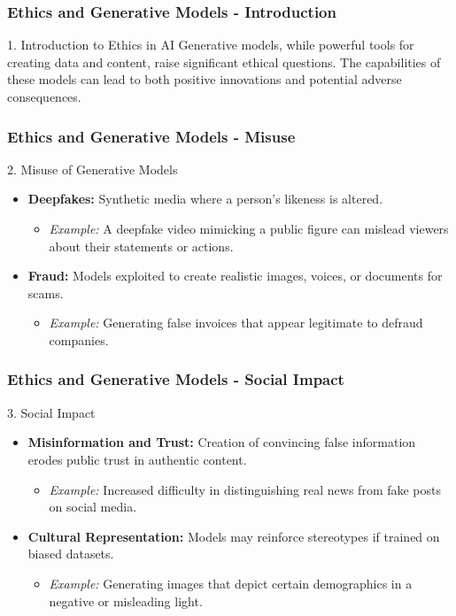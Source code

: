 \documentclass[aspectratio=169]{beamer}
\begin{document}
\begin{frame}[fragile]
    \frametitle{Ethics and Generative Models - Introduction}
    \begin{block}{1. Introduction to Ethics in AI}
        Generative models, while powerful tools for creating data and content, raise significant ethical questions. The capabilities of these models can lead to both positive innovations and potential adverse consequences.
    \end{block}
\end{frame}

\begin{frame}[fragile]
    \frametitle{Ethics and Generative Models - Misuse}
    \begin{block}{2. Misuse of Generative Models}
        \begin{itemize}
            \item \textbf{Deepfakes:} Synthetic media where a person's likeness is altered.
            \begin{itemize}
                \item \textit{Example:} A deepfake video mimicking a public figure can mislead viewers about their statements or actions.
            \end{itemize}
            \item \textbf{Fraud:} Models exploited to create realistic images, voices, or documents for scams.
            \begin{itemize}
                \item \textit{Example:} Generating false invoices that appear legitimate to defraud companies.
            \end{itemize}
        \end{itemize}
    \end{block}
\end{frame}

\begin{frame}[fragile]
    \frametitle{Ethics and Generative Models - Social Impact}
    \begin{block}{3. Social Impact}
        \begin{itemize}
            \item \textbf{Misinformation and Trust:} Creation of convincing false information erodes public trust in authentic content.
            \begin{itemize}
                \item \textit{Example:} Increased difficulty in distinguishing real news from fake posts on social media.
            \end{itemize}
            \item \textbf{Cultural Representation:} Models may reinforce stereotypes if trained on biased datasets.
            \begin{itemize}
                \item \textit{Example:} Generating images that depict certain demographics in a negative or misleading light.
            \end{itemize}
        \end{itemize}
    \end{block}
\end{frame}
\end{document}
